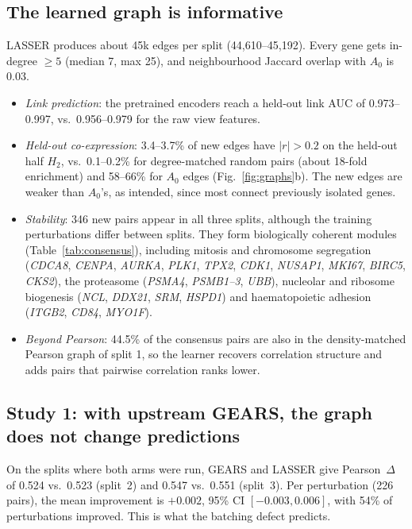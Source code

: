 \documentclass[11pt]{article}
\newcommand{\GEARS}{\textsc{GEARS}}
\newcommand{\LASSER}{\textsc{LASSER}}
\begin{document}
\subsection{The learned graph is informative}
\LASSER{} produces about 45k edges per split (44,610--45,192). Every gene gets in-degree $\ge 5$ (median 7, max
25), and neighbourhood Jaccard overlap with $A_0$ is 0.03.
\begin{itemize}
  \item \emph{Link prediction}: the pretrained encoders reach a held-out link AUC of 0.973--0.997, vs.\
        0.956--0.979 for the raw view features.
  \item \emph{Held-out co-expression}: 3.4--3.7\% of new edges have $|r|>0.2$ on the held-out half $H_2$, vs.\
        0.1--0.2\% for degree-matched random pairs (about 18-fold enrichment) and 58--66\% for $A_0$ edges
        (Fig.~\ref{fig:graphs}b). The new edges are weaker than $A_0$'s, as intended, since most connect previously
        isolated genes.
  \item \emph{Stability}: 346 new pairs appear in all three splits, although the training perturbations differ
        between splits. They form biologically coherent modules (Table~\ref{tab:consensus}), including mitosis and
        chromosome segregation (\textit{CDCA8}, \textit{CENPA}, \textit{AURKA}, \textit{PLK1}, \textit{TPX2},
        \textit{CDK1}, \textit{NUSAP1}, \textit{MKI67}, \textit{BIRC5}, \textit{CKS2}), the proteasome
        (\textit{PSMA4}, \textit{PSMB1--3}, \textit{UBB}), nucleolar and ribosome biogenesis (\textit{NCL},
        \textit{DDX21}, \textit{SRM}, \textit{HSPD1}) and haematopoietic adhesion (\textit{ITGB2}, \textit{CD84},
        \textit{MYO1F}).
  \item \emph{Beyond Pearson}: 44.5\% of the consensus pairs are also in the density-matched Pearson graph of
        split 1, so the learner recovers correlation structure and adds pairs that pairwise correlation ranks
        lower.
\end{itemize}

\subsection{Study 1: with upstream GEARS, the graph does not change predictions}
On the splits where both arms were run, \GEARS{} and \LASSER{} give Pearson~$\Delta$ of 0.524 vs.\ 0.523
(split~2) and 0.547 vs.\ 0.551 (split~3). Per perturbation (226 pairs), the mean improvement is $+0.002$, 95\% CI
$[-0.003, 0.006]$, with 54\% of perturbations improved. This is what the batching defect predicts.
\end{document}
